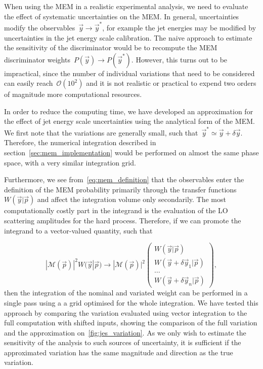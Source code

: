 When using the MEM in a realistic experimental analysis, we need to evaluate the effect of systematic uncertainties on the MEM. In general, uncertainties modify the observables~$\vec{y} \rightarrow \vec{y}^*$, for example the jet energies may be modified by uncertainties in the jet energy scale calibration. The naive approach to estimate the sensitivity of the discriminator would be to recompute the MEM discriminator weights~$P(\vec{y}) \rightarrow P(\vec{y}^*)$. However, this turns out to be impractical, since the number of individual variations that need to be considered can easily reach~$\mathcal{O}(10^2)$ and it is not realistic or practical to expend two orders of magnitude more computational resources.

In order to reduce the computing time, we have developed an approximation for the effect of jet energy scale uncertainties using the analytical form of the MEM. We first note that the variations are generally small, such that~$\vec{y}^* \simeq \vec{y} + \delta \vec{y}$. Therefore, the numerical integration described in section~\cref{sec:mem_implementation} would be performed on almost the same phase space, with a very similar integration grid.

Furthermore, we see from~\cref{eq:mem_definition} that the observables enter the definition of the MEM probability primarily through the transfer functions~$W(\vec{y} | \vec{p})$ and affect the integration volume only secondarily. The most computationally costly part in the integrand is the evaluation of the LO scattering amplitudes for the hard process. Therefore, if we can promote the integrand to a vector-valued quantity, such that

\begin{equation}
|\mathcal{M}(\vec{p})|^2 W(\vec{y} | \vec{p}) \rightarrow |\mathcal{M}(\vec{p})|^2  \begin{pmatrix}
  W(\vec{y} | \vec{p}) \\
  W(\vec{y} + \delta \vec{y}_1 | \vec{p}) \\
  \dots \\
  W(\vec{y} + \delta \vec{y}_n | \vec{p})
 \end{pmatrix},
\end{equation}
then the integration of the nominal and variated weight can be performed in a single pass using a a grid optimised for the whole integration. We have tested this approach by comparing the variation evaluated using vector integration to the full computation with shifted inputs, showing the comparison of the full variation and the approximation on~\cref{fig:jes_variation}. As we only wish to estimate the sensitivity of the analysis to such sources of uncertainty, it is sufficient if the approximated variation has the same magnitude and direction as the true variation.

